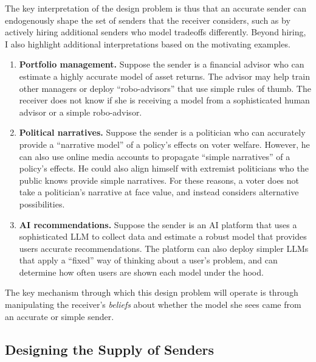 \documentclass[11pt,dvipsnames]{article}
\begin{document}
The key interpretation of the design problem is thus that an accurate sender can endogenously shape the set of senders that the receiver considers, such as by actively hiring additional senders who model tradeoffs differently.
Beyond hiring, I also highlight additional interpretations based on the motivating examples.
\begin{enumerate}
\item \textbf{Portfolio management.} Suppose the sender is a financial advisor who can estimate a highly accurate model of asset returns. The advisor may help train other managers or deploy ``robo-advisors'' that use simple rules of thumb. The receiver does not know if she is receiving a model from a sophisticated human advisor or a simple robo-advisor.

\item \textbf{Political narratives.} Suppose the sender is a politician who can accurately provide a ``narrative model'' of a policy's effects on voter welfare. However, he can also use online media accounts to propagate ``simple narratives'' of a policy's effects. He could also align himself with extremist politicians who the public knows provide simple narratives. For these reasons, a voter does not take a politician's narrative at face value, and instead considers alternative possibilities.

\item \textbf{AI recommendations.} Suppose the sender is an AI platform that uses a sophisticated LLM to collect data and estimate a robust model that provides users accurate recommendations. The platform can also deploy simpler LLMs that apply a ``fixed'' way of thinking about a user's problem, and can determine how often users are shown each model under the hood.
\end{enumerate}
The key mechanism through which this design problem will operate is through manipulating the receiver's \emph{beliefs} about whether the model she sees came from an accurate or simple sender.

\subsection{Designing the Supply of Senders}
\end{document}
